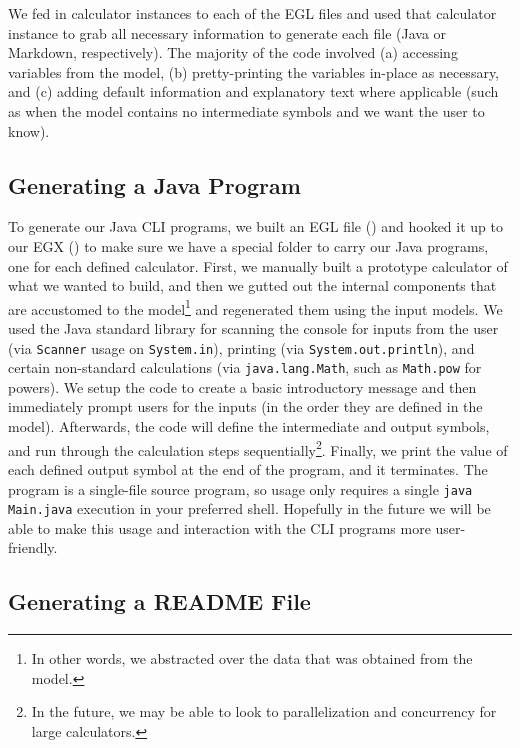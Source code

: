 \documentclass[11pt,fleqn]{article}
\begin{document}
We fed in calculator instances to each of the EGL files and used that calculator
instance to grab all necessary information to generate each file (Java or
Markdown, respectively). The majority of the code involved (a) accessing
variables from the model, (b) pretty-printing the variables in-place as
necessary, and (c) adding default information and explanatory text where
applicable (such as when the model contains no intermediate symbols and we want
the user to know).

\subsection{Generating a Java Program}
\label{sec:model-management-operations:subsec:generating-a-java-program}

To generate our Java CLI programs, we built an EGL file
() and hooked it up to our EGX
() to make sure we have a special folder to carry
our Java programs, one for each defined calculator. First, we manually built a
prototype calculator of what we wanted to build, and then we gutted out the
internal components that are accustomed to the model\footnote{In other words, we
abstracted over the data that was obtained from the model.} and regenerated them
using the input models. We used the Java standard library for scanning the
console for inputs from the user (via \lstinline{Scanner} usage on
\lstinline{System.in}), printing (via \lstinline{System.out.println}), and
certain non-standard calculations (via \lstinline{java.lang.Math}, such as
\lstinline{Math.pow} for powers). We setup the code to create a basic
introductory message and then immediately prompt users for the inputs (in the
order they are defined in the model). Afterwards, the code will define the
intermediate and output symbols, and run through the calculation steps
sequentially\footnote{In the future, we may be able to look to parallelization
and concurrency for large calculators.}. Finally, we print the value of each
defined output symbol at the end of the program, and it terminates. The program
is a single-file source program, so usage only requires a single
\lstinline{java Main.java} execution in your preferred shell. Hopefully in the
future we will be able to make this usage and interaction with the CLI programs
more user-friendly.

\subsection{Generating a README File}
\label{sec:model-management-operations:subsec:generating-a-readme-file}
\end{document}
